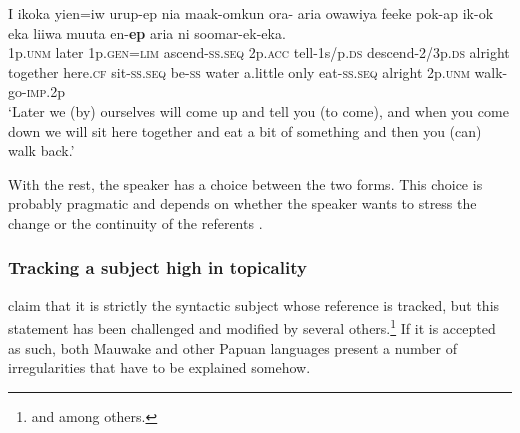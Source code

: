 \ea
\label{ex:8:x248}
\gll I  ikoka  yien=iw  urup-ep  nia  maak-omkun ora-  aria  owawiya  feeke  pok-ap  ik-ok eka  liiwa  muuta  en-\textbf{ep}  aria  ni  soomar-ek-eka. \\
1p.\textsc{unm} later 1p.\textsc{gen}=\textsc{lim} ascend-\textsc{ss}.\textsc{seq} 2p.\textsc{acc} tell-1s/p.\textsc{ds} descend-2/3p.\textsc{ds} alright  together  here.\textsc{cf} sit-\textsc{ss}.\textsc{seq} be-\textsc{ss} water  a.little  only  eat-\textsc{ss}.\textsc{seq} alright 2p.\textsc{unm} walk-go-\textsc{imp}.2p\\
\glt `Later we (by) ourselves will come up and tell you (to come), and when you come down we will sit here together and eat a bit of something and then you (can) walk back.'
\z
{}







With the rest, the speaker has a choice between the two forms. This choice is probably pragmatic and depends on whether the speaker wants to stress the change or the continuity of the referents \citep[47]{Franklin1983}. 

\subsubsection{Tracking a subject high in topicality} 

\citet[xi]{HaimanEtAl1983} claim that it is strictly the syntactic subject whose reference is tracked, but this statement has been challenged and modified by several others.\footnote{\citet{Givon1983,Reesink1983a,Reesink1987,Roberts1988b,Roberts1997} and \citealt{Farr1999} among others.} If it is accepted as such, both Mauwake and other Papuan languages present a number of irregularities that have to be explained somehow.


